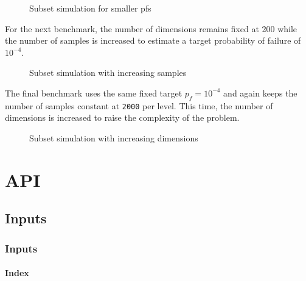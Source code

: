 \begin{figure}
\centering
{}
\caption{Subset simulation for smaller pfs}
\end{figure}




For the next benchmark, the number of dimensions remains fixed at 200 while the  number of samples is increased to estimate a target probability of failure of \(10^{-4}\).



\begin{figure}
\centering
{}
\caption{Subset simulation with increasing samples}
\end{figure}




The final benchmark uses the same fixed target \(p_{f} = 10^{-4}\) and again keeps the number of samples constant at \texttt{2000} per level. This time, the number of dimensions is increased to raise the complexity of the problem.



\begin{figure}
\centering
{}
\caption{Subset simulation with increasing dimensions}
\end{figure}




\part{API}


\chapter{Inputs}


\section{Inputs}



\label{509063468412031875}{}


\subsection{Index}



\label{6663683553518785561}{}

